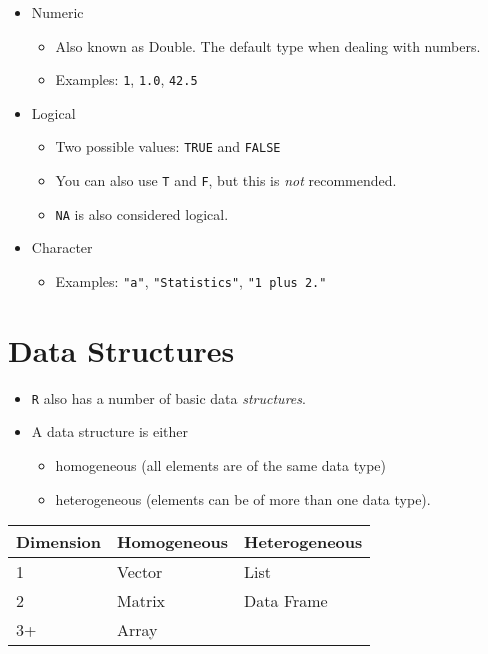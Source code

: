 \documentclass[]{book}
\providecommand{\tightlist}{%
  \setlength{\itemsep}{0pt}\setlength{\parskip}{0pt}}
\begin{document}
\begin{itemize}
\tightlist
\item
  Numeric

  \begin{itemize}
  \tightlist
  \item
    Also known as Double. The default type when dealing with numbers.
  \item
    Examples: \texttt{1}, \texttt{1.0}, \texttt{42.5}
  \end{itemize}
\item
  Logical

  \begin{itemize}
  \tightlist
  \item
    Two possible values: \texttt{TRUE} and \texttt{FALSE}
  \item
    You can also use \texttt{T} and \texttt{F}, but this is \emph{not} recommended.
  \item
    \texttt{NA} is also considered logical.
  \end{itemize}
\item
  Character

  \begin{itemize}
  \tightlist
  \item
    Examples: \texttt{"a"}, \texttt{"Statistics"}, \texttt{"1\ plus\ 2."}
  \end{itemize}
\end{itemize}

\hypertarget{data-structures}{%
\section{Data Structures}\label{data-structures}}

\begin{itemize}
\tightlist
\item
  \texttt{R} also has a number of basic data \emph{structures}.
\item
  A data structure is either

  \begin{itemize}
  \tightlist
  \item
    homogeneous (all elements are of the same data type)
  \item
    heterogeneous (elements can be of more than one data type).
  \end{itemize}
\end{itemize}

\begin{longtable}[]{@{}lll@{}}
\toprule
Dimension & \textbf{Homogeneous} & \textbf{Heterogeneous}\tabularnewline
\midrule
\endhead
1 & Vector & List\tabularnewline
2 & Matrix & Data Frame\tabularnewline
3+ & Array &\tabularnewline
\bottomrule
\end{longtable}
\end{document}
